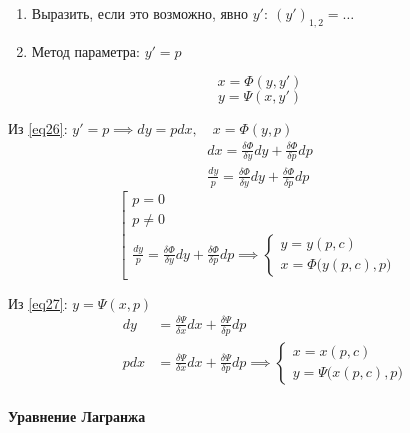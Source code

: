 \documentclass[11pt,a4paper,oneside]{report}
\theoremstyle{definition}
\theoremstyle{plain}
\theoremstyle{remark}
\begin{document}
\begin{enumerate}
    \item Выразить, если это возможно, явно $y': \ (y')_{1,2} = \ldots$
    \item Метод параметра: $y'=p$
\end{enumerate}
\begin{equation}\label{eq26}
    x = \Phi (y,y')
\end{equation}
\begin{equation}
    y = \Psi (x,y')\label{eq27}
\end{equation}

Из \ref{eq26}: $y' = p \implies dy = pdx, \quad x = \Phi(y,p)$
\begin{eqnarray*}
    dx = \frac{\delta \Phi}{\delta y}dy + \frac{\delta \Phi}{\delta p}dp \\
    \frac{dy}{p} = \frac{\delta \Phi}{\delta y}dy + \frac{\delta \Phi}{\delta p}dp
\end{eqnarray*}
\begin{equation*}
    \left[\begin{array}{l}
        p = 0   \\
        p \ne 0 \\
        \frac{dy}{p} = \frac{\delta \Phi}{\delta y}dy + \frac{\delta \Phi}{\delta p}dp \implies \left\{
        \begin{array}{l}
            y = y(p,c) \\
            x = \Phi \big(y(p,c),p\big)
        \end{array}\right.
    \end{array}\right.
\end{equation*}

Из \ref{eq27}: $y = \Psi(x,p)$
\begin{eqnarray*}
    & dy & = \frac{\delta \Psi}{\delta x}dx + \frac{\delta \Psi}{\delta p}dp \\
    & pdx & = \frac{\delta \Psi}{\delta x}dx + \frac{\delta \Psi}{\delta p}dp \implies \left\{\begin{array}{l}
        x = x(p,c) \\
        y = \Psi\big(x(p,c),p\big)
    \end{array}\right.
\end{eqnarray*}

\paragraph*{Уравнение Лагранжа}
\end{document}
